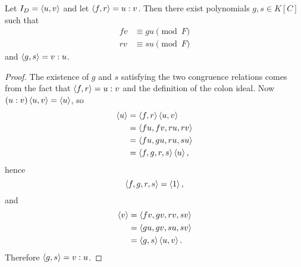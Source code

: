 \begin{lemma}
  \label{lem_reverse_colon}
  Let $I_D = \left\langle u,v \right\rangle$ and let $\left\langle f, r \right\rangle = u : v$.
  Then there exist polynomials $g, s \in K[C]$ such that
  \begin{align*}
    fv &\equiv gu \pmod F \\
    rv &\equiv su \pmod F
  \end{align*}
  and $\left\langle g, s \right\rangle = v : u$.
\end{lemma}
\begin{proof}
  The existence of $g$ and $s$ satisfying the two congruence relations
  comes from the fact that $\left\langle f,r \right\rangle = u : v$ and the definition of the colon ideal.
  Now $(u : v)\left\langle u,v \right\rangle = \left\langle u \right\rangle$, so
  \begin{align*}
    \left\langle u \right\rangle
      &= \left\langle f,r \right\rangle\left\langle u,v \right\rangle \\
      &= \left\langle fu, fv, ru, rv \right\rangle \\
      &= \left\langle fu, gu, ru, su \right\rangle \\
      &= \left\langle f, g, r, s \right\rangle\left\langle u \right\rangle,
  \end{align*}
  hence
  \begin{equation}
    \label{eq_fgrs_is_1}
    \left\langle f,g,r,s \right\rangle = \left\langle 1 \right\rangle,
  \end{equation}
  and
  \begin{align*}
    \left\langle v \right\rangle
      &= \left\langle fv, gv, rv, sv \right\rangle \\
      &= \left\langle gu, gv, su, sv \right\rangle \\
      &= \left\langle g,s \right\rangle\left\langle u,v \right\rangle.
  \end{align*}
  Therefore $\left\langle g,s \right\rangle = v : u$.
\end{proof}

